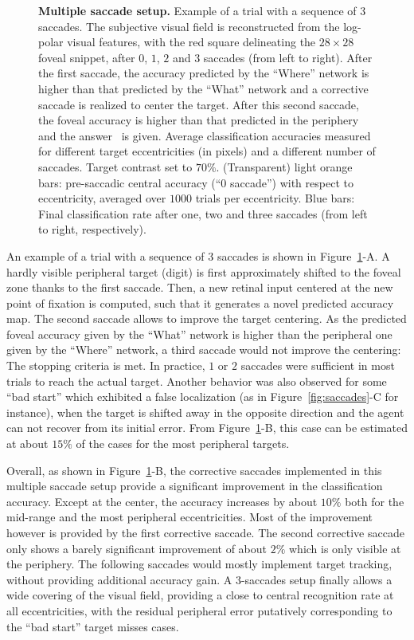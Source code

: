 \begin{figure}[t!]
	\caption{
		{\bf Multiple saccade setup.} %
		\A Example of a trial with a sequence of $3$ saccades. The subjective visual field is reconstructed from the log-polar visual features, with the red square delineating the $28\times28$ foveal snippet, after $0$, $1$, $2$ and $3$ saccades (from left to right). After the first saccade, the accuracy predicted by the ``Where'' network is higher than that predicted by the ``What'' network and a corrective saccade is realized to center the target. After this second saccade, the foveal accuracy is higher than that predicted in the periphery and the answer \ANS\ is given.
		\B Average classification accuracies measured for different target eccentricities (in pixels) and a different number of saccades. Target contrast set to $70\%$. (Transparent) light orange bars: pre-saccadic central accuracy (``0 saccade'') with respect to eccentricity, averaged over $1000$ trials per eccentricity. Blue bars: Final classification rate after one, two and three saccades (from left to right, respectively).
		\label{fig:results-saccades}}%
\end{figure}%
An example of a trial with a sequence of 3 saccades is shown in Figure~\ref{fig:results-saccades}-A. A hardly visible peripheral  target (digit) is first approximately shifted to the foveal zone thanks to the first saccade. Then, a new retinal input centered at the new point of fixation is computed, such that it generates a novel predicted accuracy map. The second saccade allows to improve the target centering. As the predicted foveal accuracy given by the ``What'' network is higher than the peripheral one given by the ``Where'' network, a third saccade would not improve the centering: The stopping criteria is met. In practice, $1$ or $2$ saccades were sufficient in most trials to reach the actual target. Another behavior was also observed for some ``bad start'' which exhibited a false localization (as in Figure~\ref{fig:saccades}-C for instance), when the target is shifted away in the opposite direction and the agent can not recover from its initial error. From Figure~\ref{fig:results-saccades}-B, this case can be estimated at about $15\%$ of the cases for the most peripheral targets.

Overall, as shown in Figure~\ref{fig:results-saccades}-B, the corrective saccades implemented in this multiple saccade setup provide a significant improvement in the classification accuracy. Except at the center, the accuracy increases by about $10\%$ both for the mid-range and the most peripheral eccentricities. Most of the improvement however is provided by the first corrective saccade. The second corrective saccade only shows a barely significant improvement of about $2\%$ which is only visible at the periphery. The following saccades would mostly implement target tracking, without providing additional accuracy gain. A 3-saccades setup finally allows a wide covering of the visual field, providing a close to central recognition rate at all eccentricities, with the residual peripheral error putatively corresponding to the ``bad start'' target misses cases.
